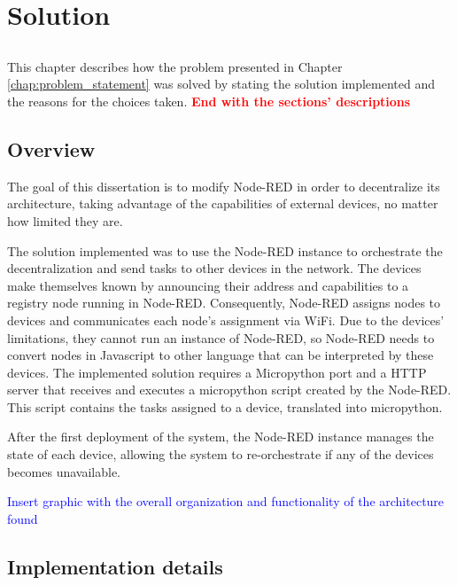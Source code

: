 \chapter{Solution} \label{chap:solution} \minitoc

\section*{}

This chapter describes how the problem presented in Chapter \ref{chap:problem_statement} was solved by stating the solution implemented and the reasons for the choices taken.  \textbf{\textcolor{red}{End with the sections' descriptions}}

\section{Overview}\label{sec:solution_overview}

The goal of this dissertation is to modify Node-RED in order to decentralize its architecture, taking advantage of the capabilities of external devices, no matter how limited they are.

The solution implemented was to use the Node-RED instance to orchestrate the decentralization and send tasks to other devices in the network. The devices make themselves known by announcing their address and capabilities to a registry node running in Node-RED. Consequently, Node-RED assigns nodes to devices and communicates each node's assignment via WiFi. Due to the devices' limitations, they cannot run an instance of Node-RED, so Node-RED needs to convert nodes in Javascript to other language that can be interpreted by these devices. The implemented solution requires a Micropython port and a HTTP server that receives and executes a micropython script created by the Node-RED. This script contains the tasks assigned to a device, translated into micropython. 

After the first deployment of the system, the Node-RED instance manages the state of each device, allowing the system to re-orchestrate if any of the devices becomes unavailable.

\textcolor{blue}{Insert graphic with the overall organization and functionality of the architecture found}


\section{Implementation details}\label{sec:implementation_details}

